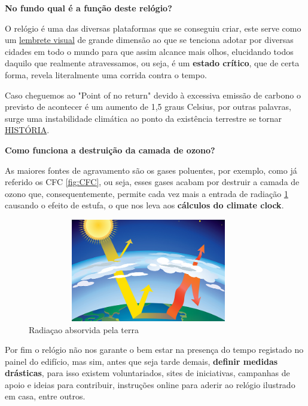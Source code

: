 \documentclass[letterpaper,12pt]{article}
\begin{document}
\newpage
\par\large{\textbf{No fundo qual é a função deste relógio?}}
\par O relógio é uma das diversas plataformas que se conseguiu criar, este serve como um \underline{lembrete visual} de grande dimensão ao que se tenciona adotar por diversas cidades em todo o mundo para que assim alcance mais olhos, elucidando todos daquilo que realmente atravessamos, ou seja, é um {\bf estado crítico}, que de certa forma, revela literalmente uma corrida contra o tempo. 
\par Caso cheguemos ao "Point of no return" devido à excessiva emissão de carbono o previsto de acontecer é um aumento de 1,5 graus Celsius, por outras palavras, surge uma instabilidade climática ao ponto da existência terrestre se tornar \underline{HISTÓRIA}.\\[0.3cm]
\par {\bf Como funciona a destruição da camada de ozono?}
\par As maiores fontes de agravamento são os gases poluentes, por exemplo, como já referido os CFC \ref{fig:CFC}, ou seja, esses gases acabam por destruir a camada de ozono que, consequentemente, permite cada vez mais a entrada de radiação \ref{fig:Radiação} causando o efeito de estufa, o que nos leva aos {\bf cálculos do  climate clock}.
\begin{figure}[htp]
    \centering
    \includegraphics[width = 400px, height = 170px]{eq2.jpg}
    \caption{Radiaçao absorvida pela terra}
    \label{fig:Radiação}
\end{figure}
\par Por fim o relógio não nos garante o bem estar na presença do tempo registado no painel do edifício, mas sim, antes que seja tarde demais, {\bf definir medidas drásticas}, para isso existem voluntariados, sites de iniciativas, campanhas de apoio e ideias para contribuir, instruções online para aderir ao relógio ilustrado em casa, entre outros.
\newpage
\end{document}
